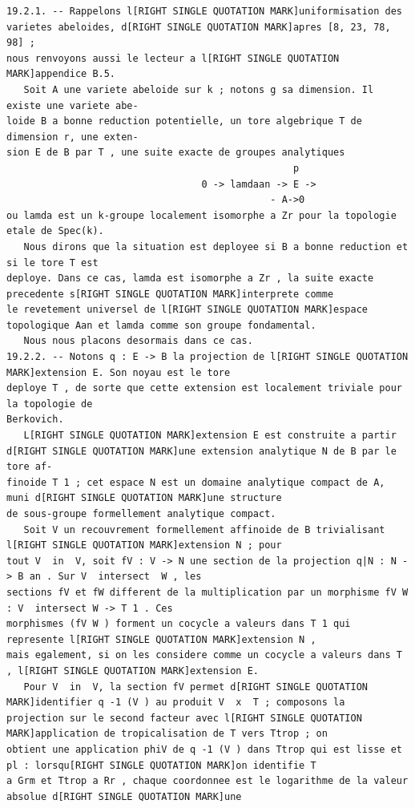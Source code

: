\documentclass[
  11pt,
]{article}
\begin{document}
\begin{lstlisting}
19.2.1. -- Rappelons l[RIGHT SINGLE QUOTATION MARK]uniformisation des varietes abeloides, d[RIGHT SINGLE QUOTATION MARK]apres [8, 23, 78, 98] ;
nous renvoyons aussi le lecteur a l[RIGHT SINGLE QUOTATION MARK]appendice B.5.
   Soit A une variete abeloide sur k ; notons g sa dimension. Il existe une variete abe-
loide B a bonne reduction potentielle, un tore algebrique T de dimension r, une exten-
sion E de B par T , une suite exacte de groupes analytiques
                                                  p
                                  0 -> lamdaan -> E ->
                                              - A->0
ou lamda est un k-groupe localement isomorphe a Zr pour la topologie etale de Spec(k).
   Nous dirons que la situation est deployee si B a bonne reduction et si le tore T est
deploye. Dans ce cas, lamda est isomorphe a Zr , la suite exacte precedente s[RIGHT SINGLE QUOTATION MARK]interprete comme
le revetement universel de l[RIGHT SINGLE QUOTATION MARK]espace topologique Aan et lamda comme son groupe fondamental.
   Nous nous placons desormais dans ce cas.
19.2.2. -- Notons q : E -> B la projection de l[RIGHT SINGLE QUOTATION MARK]extension E. Son noyau est le tore
deploye T , de sorte que cette extension est localement triviale pour la topologie de
Berkovich.
   L[RIGHT SINGLE QUOTATION MARK]extension E est construite a partir d[RIGHT SINGLE QUOTATION MARK]une extension analytique N de B par le tore af-
finoide T 1 ; cet espace N est un domaine analytique compact de A, muni d[RIGHT SINGLE QUOTATION MARK]une structure
de sous-groupe formellement analytique compact.
   Soit V un recouvrement formellement affinoide de B trivialisant l[RIGHT SINGLE QUOTATION MARK]extension N ; pour
tout V  in  V, soit fV : V -> N une section de la projection q|N : N -> B an . Sur V  intersect  W , les
sections fV et fW different de la multiplication par un morphisme fV W : V  intersect W -> T 1 . Ces
morphismes (fV W ) forment un cocycle a valeurs dans T 1 qui represente l[RIGHT SINGLE QUOTATION MARK]extension N ,
mais egalement, si on les considere comme un cocycle a valeurs dans T , l[RIGHT SINGLE QUOTATION MARK]extension E.
   Pour V  in  V, la section fV permet d[RIGHT SINGLE QUOTATION MARK]identifier q -1 (V ) au produit V  x  T ; composons la
projection sur le second facteur avec l[RIGHT SINGLE QUOTATION MARK]application de tropicalisation de T vers Ttrop ; on
obtient une application phiV de q -1 (V ) dans Ttrop qui est lisse et pl : lorsqu[RIGHT SINGLE QUOTATION MARK]on identifie T
a Grm et Ttrop a Rr , chaque coordonnee est le logarithme de la valeur absolue d[RIGHT SINGLE QUOTATION MARK]une

\end{lstlisting}
\end{document}
